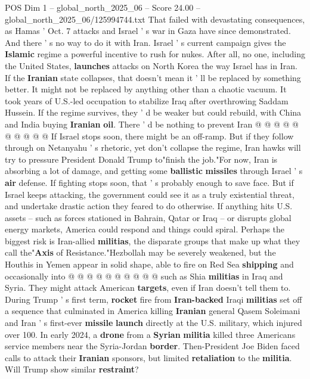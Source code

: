 \begin{textsample}{POS Dim 1 – global\_north\_2025\_06 – Score 24.00 – global\_north\_2025\_06/125994744.txt}
That failed with devastating consequences, as Hamas ' Oct. 7 attacks and Israel ' s war in Gaza have since demonstrated.
And there ' s no way to do it with Iran.
Israel ' s current campaign gives the \textbf{Islamic} regime a powerful incentive to rush for nukes.
After all, no one, including the United States, \textbf{launches} attacks on North Korea the way Israel has in Iran.
If the \textbf{Iranian} state collapses, that doesn't mean it ' ll be replaced by something better.
It might not be replaced by anything other than a chaotic vacuum.
It took years of U.S.-led occupation to stabilize Iraq after overthrowing Saddam Hussein.
If the regime survives, they ' d be weaker but could rebuild, with China and India buying \textbf{Iranian} \textbf{oil}.
There ' d be nothing to prevent Iran @ @ @ @ @ @ @ @ @ @ If Israel stops soon, there might be an off-ramp.
But if they follow through on Netanyahu ' s rhetoric, yet don't collapse the regime, Iran hawks will try to pressure President Donald Trump to"finish the job."For now, Iran is absorbing a lot of damage, and getting some \textbf{ballistic} \textbf{missiles} through Israel ' s \textbf{air} defense.
If fighting stops soon, that ' s probably enough to save face.
But if Israel keeps attacking, the government could see it as a truly existential threat, and undertake drastic action they feared to do otherwise.
If anything hits U.S. assets -- such as forces stationed in Bahrain, Qatar or Iraq -- or disrupts global energy markets, America could respond and things could spiral.
Perhaps the biggest risk is Iran-allied \textbf{militias}, the disparate groups that make up what they call the"\textbf{Axis} of Resistance."Hezbollah may be severely weakened, but the Houthis in Yemen appear in solid shape, able to fire on Red Sea \textbf{shipping} and occasionally into @ @ @ @ @ @ @ @ @ @ such as Shia \textbf{militias} in Iraq and Syria.
They might attack American \textbf{targets}, even if Iran doesn't tell them to.
During Trump ' s first term, \textbf{rocket} fire from \textbf{Iran-backed} Iraqi \textbf{militias} set off a sequence that culminated in America killing \textbf{Iranian} general Qasem Soleimani and Iran ' s first-ever \textbf{missile} \textbf{launch} directly at the U.S. military, which injured over 100.
In early 2024, a \textbf{drone} from a \textbf{Syrian} \textbf{militia} killed three Americans service members near the Syria-Jordan \textbf{border}.
Then-President Joe Biden faced calls to attack their \textbf{Iranian} sponsors, but limited \textbf{retaliation} to the \textbf{militia}.
Will Trump show similar \textbf{restraint}?

\end{textsample}

